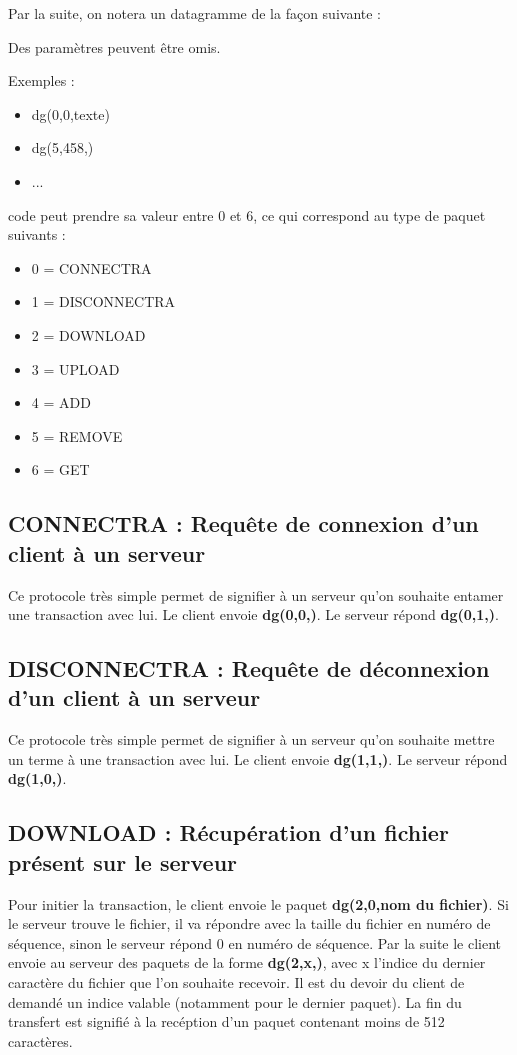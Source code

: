 \documentclass[10pt,a4paper]{article}
\begin{document}
Par la suite, on notera un datagramme de la façon suivante :

\begin{center}
\end{center}

Des paramètres peuvent être omis.

Exemples :
\begin{itemize}
 \item dg(0,0,texte)
 \item dg(5,458,)
 \item ...
\end{itemize}


code peut prendre sa valeur entre 0 et 6, ce qui correspond au type de paquet suivants :
\begin{itemize}
 \item 0 = CONNECTRA
 \item 1 = DISCONNECTRA
 \item 2 = DOWNLOAD
 \item 3 = UPLOAD
 \item 4 = ADD
 \item 5 = REMOVE
 \item 6 = GET
\end{itemize}

\subsection{CONNECTRA : Requête de connexion d'un client à un serveur}
Ce protocole très simple permet de signifier à un serveur qu'on souhaite entamer une transaction avec lui.
Le client envoie \textbf{dg(0,0,)}. Le serveur répond \textbf{dg(0,1,)}.

\subsection{DISCONNECTRA : Requête de déconnexion d'un client à un serveur}
Ce protocole très simple permet de signifier à un serveur qu'on souhaite mettre un terme à une transaction avec lui.
Le client envoie \textbf{dg(1,1,)}. Le serveur répond \textbf{dg(1,0,)}.

\subsection{DOWNLOAD : Récupération d'un fichier présent sur le serveur}
Pour initier la transaction, le client envoie le paquet \textbf{dg(2,0,nom du fichier)}.
Si le serveur trouve le fichier, il va répondre avec la taille du fichier en numéro de séquence, sinon le serveur répond 0 en numéro de séquence.
Par la suite le client envoie au serveur des paquets de la forme \textbf{dg(2,x,)}, avec x l'indice du dernier caractère du fichier que l'on souhaite recevoir. Il est du devoir du client de demandé un indice valable (notamment pour le dernier paquet).
La fin du transfert est signifié à la recéption d'un paquet contenant moins de 512 caractères.
\end{document}
